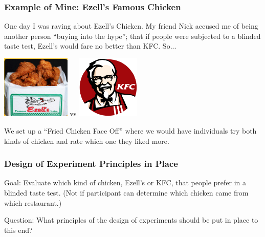 \documentclass[handout]{beamer}
\newcommand{\blue}[1]{\textcolor{blue2}{#1}}
\begin{document}
\begin{frame}
\frametitle{Example of Mine: Ezell's Famous Chicken}
One day I was raving about Ezell's Chicken.  My friend Nick accused me of being another person ``buying into the hype''; that if people were subjected to a blinded taste test, Ezell's would fare no better than KFC.  So...

\vspace{0.25cm}

\pause\begin{center}
\includegraphics[height=3cm]{figure/ezells2.png} \hspace{0.5cm} vs \hspace{0.5cm} 
\includegraphics[height=3cm]{figure/KFC.png}
\end{center}

\vspace{0.25cm}

We set up a ``Fried Chicken Face Off'' where we would have individuals try both kinds of chicken and rate which one they liked more.  


\end{frame}


\begin{frame}
\frametitle{Design of Experiment Principles in Place}

\blue{Goal}: Evaluate which kind of chicken, Ezell's or KFC, that people prefer in a blinded taste test.  (Not if participant can determine which chicken came from which restaurant.)

\vspace{0.25cm}

\blue{Question}: What principles of the design of experiments should be put in place to this end?
\end{frame}
\end{document}
